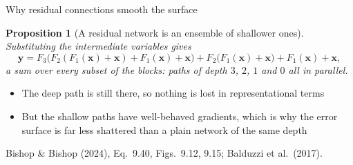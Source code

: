 \documentclass[aspectratio=169, 11pt]{beamer}
\newtheorem{propx}[theorem]{Proposition}
\newcommand{\srcline}[1]{%
  \par\vspace{0.25em}%
  {\scriptsize\color{mcMuted}\hfill #1\par}}
\newcommand{\src}[3]{}      %
\begin{document}
\begin{frame}{Why residual connections smooth the surface}
  \src{bishop2024}{equation}{9.40}
  \src{bishop2024}{figure}{9.12}
  \src{bishop2024}{figure}{9.15}
  \src{bishop2024}{section}{9.5}
  \src{balduzzi2017}{section}{3.2}
  \vspace{-0.15em}
  \begin{propx}[A residual network is an ensemble of shallower ones]\label{th:res}
    \small
    Substituting the intermediate variables gives
    \[
      \mathbf{y} = F_3\big(F_2(F_1(\mathbf{x}) + \mathbf{x}) + F_1(\mathbf{x}) + \mathbf{x}\big)
        + F_2\big(F_1(\mathbf{x}) + \mathbf{x}\big) + F_1(\mathbf{x}) + \mathbf{x} ,
    \]
    a sum over every subset of the blocks: paths of depth $3$, $2$, $1$
    and $0$ all in parallel.
  \end{propx}
  \vspace{0.25em}
  \begin{itemize}\itemsep0.26em
    \item The deep path is still there, so nothing is lost in
          representational terms
    \item But the shallow paths have well-behaved gradients, which is
          why the error surface is far less shattered than a plain
          network of the same depth
  \end{itemize}
  \srcline{Bishop \& Bishop (2024), Eq.~9.40, Figs.~9.12, 9.15;
  Balduzzi et al.\ (2017).}
\end{frame}
\end{document}
